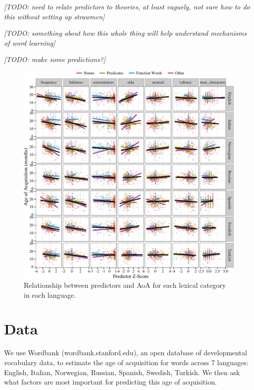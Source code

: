 \documentclass[10pt, letterpaper]{article}
\newenvironment{CodeChunk}{}{}
\begin{document}
\emph{{[}TODO: need to relate predictors to theories, at least vaguely,
not sure how to do this without setting up strawmen{]}}

\emph{{[}TODO: something about how this whole thing will help understand
mechanisms of word learning{]}}

\emph{{[}TODO: make some predictions?{]}}

\newpage

\begin{CodeChunk}
\begin{figure}[!h]

{\centering \includegraphics{figs/data-1} 

}

\caption[Relationship between predictors and AoA for each lexical category in each language]{Relationship between predictors and AoA for each lexical category in each language.}\label{fig:data}
\end{figure}
\end{CodeChunk}

\section{Data}\label{data}

We use Wordbank (wordbank.stanford.edu), an open database of
developmental vocabulary data, to estimate the age of acquisition for
words across 7 languages: English, Italian, Norwegian, Russian, Spanish,
Swedish, Turkish. We then ask what factors are most important for
predicting this age of acquisition.
\end{document}
